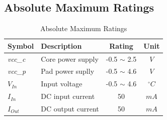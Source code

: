 \subsection{Absolute Maximum Ratings}
\begin{table}[htbp]
 \caption{Absolute Maximum Ratings \cite{faraday}}
 \label{tab:elect_rec}
\centering\begin{tabular}{|l|l|c|c|} \hline
Symbol & Description & Rating & Unit \\ \hline
\textit{vcc\_c} & Core power supply & -0.5 $\sim$ 2.5 & $V$ \\ \hline
\textit{vcc\_p} & Pad power suplly & -0.5 $\sim$ 4.6 & $V$ \\ \hline
$V_{In}$ & Input voltage &  -0.5 $\sim$ 4.6 & $^{\circ} C$ \\ \hline
$I_{In}$ & DC input current & 50 & $mA$ \\ \hline
$I_{Out}$ & DC output current & 50 & $mA$ \\ \hline
 \end{tabular}
\end{table}

